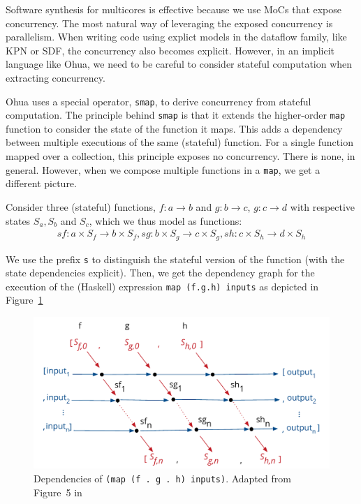 Software synthesis for multicores is effective because we use \acp{MoC} that expose concurrency.
The most natural way of leveraging the exposed concurrency is parallelism. 
When writing code using explict models in the dataflow family, like \ac{KPN} or \ac{SDF}, the concurrency also becomes explicit.
However, in an implicit language like Ohua, we need to be careful to consider stateful computation when extracting concurrency.

Ohua uses a special operator, \texttt{smap}, to derive concurrency from stateful computation.
The principle behind \texttt{smap} is that it extends the higher-order \texttt{map} function to consider the state of the function it maps.
This adds a dependency between multiple executions of the same (stateful) function.
For a single function mapped over a collection, this principle exposes no concurrency. There is none, in general.
However, when we compose multiple functions in a \texttt{map}, we get a different picture.

Consider three (stateful) functions, $f: a \rightarrow b$ and $g : b \rightarrow c$, $g : c \rightarrow d$ with respective states $S_a, S_b$ and $S_c$, which we thus model as functions: 
\begin{align*}
sf : a \times S_f \rightarrow b \times S_f, sg : b \times S_g \rightarrow c \times S_g, sh : c \times S_h \rightarrow d \times S_h
\end{align*}

We use the prefix \texttt{s} to distinguish the stateful version of the function (with the state dependencies explicit).
Then, we get the dependency graph for the execution of the (Haskell) expression \texttt{map (f.g.h) inputs} as depicted in Figure~\ref{fig:smap_state}

\begin{figure}[h]
	\centering
	\includegraphics[scale=0.5]{figures/smap_state.pdf}
	\caption{ Dependencies of \texttt{(map (f . g . h) inputs)}. Adapted from Figure~5 in~\cite{ertel_haskell19}}
	\label{fig:smap_state}
\end{figure}

